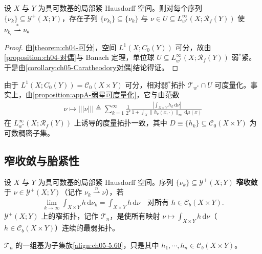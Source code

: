 \documentclass[../../main.tex]{subfiles}%
\begin{document}
\begin{theorem}\label{theorem:ch05-Young弱星紧}
设 $X$ 与 $Y$ 为具可数基的局部紧 Hausdorff 空间。则对每个序列 $\{\nu_k\}\subseteq\mathcal{Y}^+(X;Y)$，存在子列 $\{\nu_{k_l}\}\subseteq\{\nu_k\}$ 与 $\nu\in U\subseteq L^\infty_{w^*}(X;\mathscr{R}_f(Y))$ 使 $\nu_{k_l}\stackrel{*}{\rightharpoonup}\nu$。
\end{theorem}

\begin{proof}
由\cref{theorem:ch04-可分}，空间 $L^1(X;C_0(Y))$ 可分，故由\cref{proposition:ch04-对偶}与 Banach 定理，单位球 $U\subseteq L^\infty_{w^*}(X;\mathscr{R}_f(Y))$ 弱$^*$紧。于是由\cref{corollary:ch05-Caratheodory对偶}结论得证。
\end{proof}

\begin{remark}\label{remark:ch05-Young弱星度量}
由于 $L^1(X;C_0(Y))=\mathcal{C}_0(X\times Y)$ 可分，相对弱$^*$拓扑 $\mathcal{T}_{w^*}\cap U$ 可度量化。事实上，由\cref{proposition:appA-弱星可度量化}，它与由范数
\begin{align}
\nu\mapsto|||\nu|||
\triangleq \sum_{k=1}^\infty\frac{1}{2^k}
\frac{\left|\int_{X\times Y}h_k\,\mathrm{d}\nu\right|}
{1+\int_X\|h_k(x,\cdot)\|_\infty\,\mathrm{d}\mu(x)}\label{align:ch05-5.61}
\end{align}
在 $L^\infty_{w^*}(X;\mathscr{R}_f(Y))$ 上诱导的度量拓扑一致，其中 $D\equiv\{h_k\}\subseteq\mathcal{C}_0(X\times Y)$ 为可数稠密子集。
\end{remark}

\subsection{窄收敛与胎紧性}\label{subsection:ch05-Young窄}

\begin{definition}\label{definition:ch05-Young窄}
设 $X$ 与 $Y$ 为具可数基的局部紧 Hausdorff 空间。序列 $\{\nu_k\}\subseteq\mathcal{Y}^+(X;Y)$ \textbf{窄收敛}于 $\nu\in\mathcal{Y}^+(X;Y)$（记作 $\nu_k\stackrel{n}{\rightharpoonup}\nu$），若
\begin{align*}
\lim_{k\to\infty}\int_{X\times Y}h\,\mathrm{d}\nu_k
=\int_{X\times Y}h\,\mathrm{d}\nu
\quad\text{对所有 }h\in\mathcal{C}_b(X\times Y).
\end{align*}
$\mathcal{Y}^+(X;Y)$ 上的窄拓扑，记作 $\mathcal{T}_n$，是使所有映射 $\nu\mapsto\int_{X\times Y}h\,\mathrm{d}\nu$（$h\in\mathcal{C}_b(X\times Y)$）连续的最弱拓扑。

$\mathcal{T}_n$ 的一组基为子集族\eqref{align:ch05-5.60}，只是其中 $h_1,\cdots ,h_n\in\mathcal{C}_b(X\times Y)$。
\end{definition}
\end{document}
